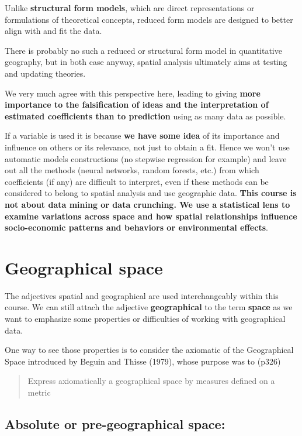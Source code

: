 \documentclass[
  letterpaper,
  DIV=11,
  numbers=noendperiod]{scrreprt}
\begin{document}
Unlike \textbf{structural form models}, which are direct representations
or formulations of theoretical concepts, reduced form models are
designed to better align with and fit the data.

There is probably no such a reduced or structural form model in
quantitative geography, but in both case anyway, spatial analysis
ultimately aims at testing and updating theories.

We very much agree with this perspective here, leading to giving
\textbf{more importance to the falsification of ideas and the
interpretation of estimated coefficients than to prediction} using as
many data as possible.

If a variable is used it is because \textbf{we have some idea} of its
importance and influence on others or its relevance, not just to obtain
a fit. Hence we won't use automatic models constructions (no stepwise
regression for example) and leave out all the methods (neural networks,
random forests, etc.) from which coefficients (if any) are difficult to
interpret, even if these methods can be considered to belong to spatial
analysis and use geographic data. \textbf{This course is not about data
mining or data crunching. We use a statistical lens to examine
variations across space and how spatial relationships influence
socio-economic patterns and behaviors or environmental effects}.

\chapter{Geographical space}\label{sec-geographical-space}

The adjectives spatial and geographical are used interchangeably within
this course. We can still attach the adjective \textbf{geographical} to
the term \textbf{space} as we want to emphasize some properties or
difficulties of working with geographical data.

One way to see those properties is to consider the axiomatic of the
Geographical Space introduced by Beguin and Thisse (1979), whose purpose
was to (p326)

\begin{quote}
Express axiomatically a geographical space by measures defined on a
metric
\end{quote}

\section{Absolute or pre-geographical
space:}\label{absolute-or-pre-geographical-space}
\end{document}
